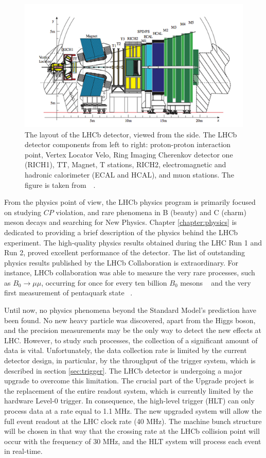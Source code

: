 \begin{figure}
\centering
\includegraphics[scale=0.6]{figures/lhcblayout.png}
\caption{The layout of the LHCb detector, viewed from the side. The LHCb detector components from left to right: proton-proton interaction point, Vertex Locator Velo, Ring Imaging Cherenkov detector one (RICH1), TT, Magnet, T stations, RICH2, electromagnetic and hadronic calorimeter (ECAL and HCAL), and muon stations. The figure is taken from~~\cite{lhcb}. 
\label{fig:LHCBlayout}}
\end{figure}



From the physics point of view, the LHCb physics program is primarily focused on studying $CP$ violation, and rare phenomena in B (beauty) and C (charm) meson decays and searching for New Physics. Chapter \ref{chapter:physics} is dedicated to providing a brief description of the physics behind the LHCb experiment.  
The high-quality physics results obtained during the LHC Run 1 and Run 2, proved excellent performance of the detector.
The list of outstanding physics results published by the LHCb Collaboration is extraordinary. For instance, LHCb collaboration was able to measure the very rare processes, such as $B_0\rightarrow \mu \mu$, occurring for once for every ten billion $B_0$ mesons ~\cite{B_mumu} and the very first measurement of pentaquark state ~\cite{pentaquarks}.  
  
Until now, no physics phenomena beyond the Standard Model's prediction have been found. No new heavy particle was discovered, apart from the Higgs boson, and the precision measurements may be the only way to detect the new effects at LHC. However, to study such processes, the collection of a significant amount of data is vital. Unfortunately, the data collection rate is limited by the current detector design, in particular, by the throughput of the trigger system, which is described in section \ref{sec:trigger}. The LHCb detector is undergoing a major upgrade to overcome this limitation. The crucial part of the Upgrade project is the replacement of the entire readout system, which is currently limited by the hardware Level-0 trigger.
In consequence, the high-level trigger (HLT) can only process data at a rate equal to 1.1 MHz. The new upgraded system will allow the full event readout at the LHC clock rate (40 MHz). The machine bunch structure will be chosen in that way that the crossing rate at the LHCb collision point will occur with the frequency of 30 MHz, and the HLT system will process each event in real-time.

